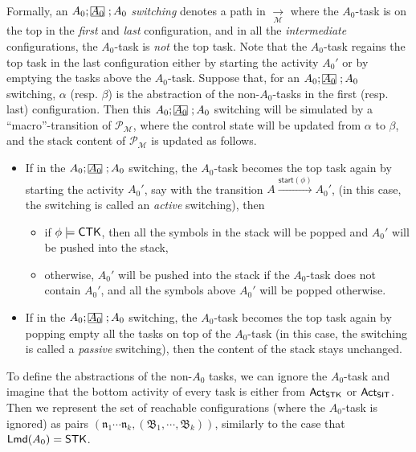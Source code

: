 \documentclass[preprint,12pt]{elsarticle}
\newcommand\rectangled[1]{\tikz[baseline=(torect.base)]{
    \node[shape = rectangle, draw, inner sep=0pt, outer sep = 0pt] (torect) {#1}
    }
}
\newcommand{\mrectangled}[1]{\text{\rectangled{\ensuremath{#1}}}}
\newcommand{\mhcancel}[1]{\mrectangled{#1}}
\newcommand\Mm{{\mathcal{M} }}
\newcommand\Pp{{\mathcal{P} }}
\newcommand\act{{\sf Act}}
\newcommand\lmd{{\sf Lmd}}
\newcommand\singletask{{\sf STK}}
\newcommand\singleinstance{{\sf SIT}}
\newcommand\ctkflag{{\sf CTK}}
\newcommand\startactivity{{\mathsf{start} }}
\newcommand\aname{\mathfrak{n}}
\newcommand\AutB{{\mathfrak{B} }}
\begin{document}
Formally, an $A_0;\mhcancel{A_0};A_0$ \emph{switching} denotes a path in $\xrightarrow[\Mm]{}$ where the $A_0$-task is on the top in the \emph{first} and \emph{last} configuration, and in all the \emph{intermediate} configurations, the $A_0$-task is \emph{not} the top task. 
%
Note that the $A_0$-task regains the top task in the last configuration either by starting the activity $A_0'$ or by emptying the tasks above the $A_0$-task. Suppose that, for an $A_0;\mhcancel{A_0};A_0$ switching, $\alpha$ (resp. $\beta$) is the abstraction of the non-$A_0$-tasks in the first (resp. last) configuration. 
Then this $A_0;\mhcancel{A_0};A_0$ switching will be simulated by a ``macro''-transition of $\Pp_{\Mm}$, where the control state will be updated from $\alpha$ to $\beta$, and the stack content of $\Pp_{\Mm}$ is updated as follows. 
\begin{itemize}
    \item If in the $A_0; \mhcancel{A_0}; A_0$ switching, the $A_0$-task becomes the top task again by starting the activity $A_0'$, say with the transition $A\xrightarrow{\startactivity(\phi)}A_0'$, (in this case, the switching is called an \emph{active} switching), then
    \begin{itemize}
        \item if $\phi \models \ctkflag$, then all the symbols in the stack will be popped and $A_0'$ will be pushed into the stack,
        \item otherwise, $A_0'$ will be pushed into the stack if the $A_0$-task does not contain $A_0'$, and all the symbols above $A_0'$ will be popped otherwise.
    \end{itemize}
%
    \item If in the $A_0; \mhcancel{A_0}; A_0$ switching, the $A_0$-task becomes the top task again by popping empty all the tasks on top of the $A_0$-task (in this case, the switching is called a \emph{passive} switching), then the content of the stack stays unchanged.
%        
\end{itemize}

To define the abstractions of the non-$A_0$ tasks, we can ignore the $A_0$-task and imagine that the bottom activity of every task is either from $\act_{\singletask}$ or $\act_{\singleinstance}$.  Then we represent the set of reachable configurations (where the $A_0$-task is ignored) as pairs $(\aname_1 \cdots \aname_k, (\AutB_1, \cdots, \AutB_k))$, similarly to the case that $\lmd(A_0) = \singletask$. 
\end{document}
